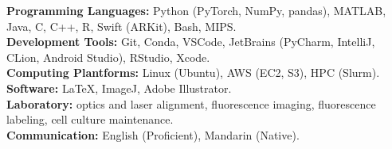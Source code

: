 \documentclass[letterpaper, 11pt]{article}
\begin{document}
    \textbf{Programming Languages:} Python (PyTorch, NumPy, pandas), MATLAB, Java, C, C++, R, Swift (ARKit), Bash, MIPS. \\
    \textbf{Development Tools:} Git, Conda, VSCode, JetBrains (PyCharm, IntelliJ, CLion, Android Studio), RStudio, Xcode. \\
    \textbf{Computing Plantforms:} Linux (Ubuntu), AWS (EC2, S3), HPC (Slurm). \\
    \textbf{Software:} LaTeX, ImageJ, Adobe Illustrator. \\
    \textbf{Laboratory:} optics and laser alignment, fluorescence imaging, fluorescence labeling, cell culture maintenance. \\
    \textbf{Communication:} English (Proficient), Mandarin (Native).
\end{document}

